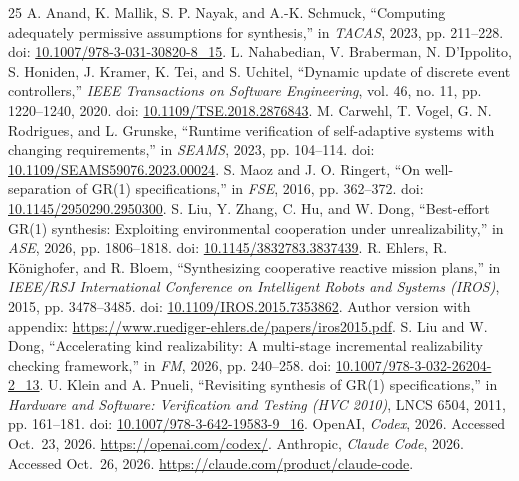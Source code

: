 \begin{thebibliography}{25}
A. Anand, K. Mallik, S. P. Nayak, and A.-K. Schmuck, ``Computing adequately permissive assumptions for synthesis,'' in \emph{TACAS}, 2023, pp. 211--228. doi: \href{https://doi.org/10.1007/978-3-031-30820-8_15}{10.1007/978-3-031-30820-8\_15}.
L. Nahabedian, V. Braberman, N. D'Ippolito, S. Honiden, J. Kramer, K. Tei, and S. Uchitel, ``Dynamic update of discrete event controllers,'' \emph{IEEE Transactions on Software Engineering}, vol. 46, no. 11, pp. 1220--1240, 2020. doi: \href{https://doi.org/10.1109/TSE.2018.2876843}{10.1109/TSE.2018.2876843}.
M. Carwehl, T. Vogel, G. N. Rodrigues, and L. Grunske, ``Runtime verification of self-adaptive systems with changing requirements,'' in \emph{SEAMS}, 2023, pp. 104--114. doi: \href{https://doi.org/10.1109/SEAMS59076.2023.00024}{10.1109/SEAMS59076.2023.00024}.
S. Maoz and J. O. Ringert, ``On well-separation of GR(1) specifications,'' in \emph{FSE}, 2016, pp. 362--372. doi: \href{https://doi.org/10.1145/2950290.2950300}{10.1145/2950290.2950300}.
S. Liu, Y. Zhang, C. Hu, and W. Dong, ``Best-effort GR(1) synthesis: Exploiting environmental cooperation under unrealizability,'' in \emph{ASE}, 2026, pp. 1806--1818. doi: \href{https://doi.org/10.1145/3832783.3837439}{10.1145/3832783.3837439}.
R. Ehlers, R. K\"onighofer, and R. Bloem, ``Synthesizing cooperative reactive mission plans,'' in \emph{IEEE/RSJ International Conference on Intelligent Robots and Systems (IROS)}, 2015, pp. 3478--3485. doi: \href{https://doi.org/10.1109/IROS.2015.7353862}{10.1109/IROS.2015.7353862}. Author version with appendix: \url{https://www.ruediger-ehlers.de/papers/iros2015.pdf}.
S. Liu and W. Dong, ``Accelerating kind realizability: A multi-stage incremental realizability checking framework,'' in \emph{FM}, 2026, pp. 240--258. doi: \href{https://doi.org/10.1007/978-3-032-26204-2_13}{10.1007/978-3-032-26204-2\_13}.
U. Klein and A. Pnueli, ``Revisiting synthesis of GR(1) specifications,'' in \emph{Hardware and Software: Verification and Testing (HVC 2010)}, LNCS 6504, 2011, pp. 161--181. doi: \href{https://doi.org/10.1007/978-3-642-19583-9_16}{10.1007/978-3-642-19583-9\_16}.
OpenAI, \emph{Codex}, 2026. Accessed Oct.~23, 2026. \url{https://openai.com/codex/}.
Anthropic, \emph{Claude Code}, 2026. Accessed Oct.~26, 2026. \url{https://claude.com/product/claude-code}.
\end{thebibliography}
